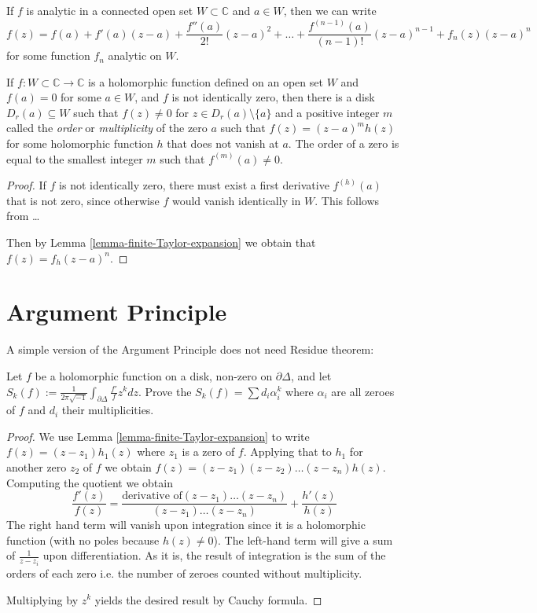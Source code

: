 \begin{lemma}
\label{lemma-finite-Taylor-expansion}
If $f$ is analytic in a connected open set $W\subset\mathbb{C}$ and $a \in W$,
then we can write
$$
f(z)=f(a)+f'(a)(z-a)+\frac{f''(a)}{2!}(z-a)^2+\ldots
+\frac{f^{(n-1)}(a)}{(n-1)!}(z-a)^{n-1}+f_n(z)(z-a)^n
$$
for some function $f_n$ analytic on $W$.
\end{lemma}

\begin{theorem}
\label{theorem-zeroes-are-isolated-and-have-finite-order}
If $f:W\subset\mathbb{C}\to \mathbb{C}$ is a holomorphic function defined on an
open set $W$ and $f(a)=0$ for some $a\in W$, and $f$ is not identically zero,
then there is a disk $D_r(a)\subseteq W$ such that $f(z)\neq 0$ for $z \in
D_r(a)\setminus\{a\}$ and a positive integer $m$ called the {\it order} or
{\it multiplicity} of the zero $a$ such that  $f(z)=(z-a)^mh(z)$ for some
holomorphic function $h$ that does not vanish at $a$. The order of a zero is
equal to the smallest integer $m$ such that $f^{(m)}(a)\neq 0$.
\end{theorem}

\begin{proof}
If $f$ is not identically zero, there must exist a first derivative $f^{
(h)}(a)$ that is not zero, since otherwise $f$ would vanish identically in $W$.
This follows from … 

Then by Lemma \ref{lemma-finite-Taylor-expansion} we obtain that
$f(z)=f_h(z-a)^n$.
\end{proof}

\section{Argument Principle}
\label{section-argument-principle}

A simple version of the Argument Principle does not need Residue theorem:

\begin{exercise}
\label{exercise-argument-principle}
Let $f$ be a holomorphic function on a disk, non-zero on $\partial \Delta$, and
let $S_k(f):=\frac{1}{2\pi\sqrt{-1}}\int_{\partial\Delta}\frac{f'}{f}z^kdz$.
Prove the $S_k(f)=\sum d_i\alpha_i^k$ where $\alpha_i$ are all zeroes of $f$ and
$d_i$ their multiplicities.
\end{exercise}

\begin{proof}
We use Lemma \ref{lemma-finite-Taylor-expansion} to write
$f(z)=(z-z_1)h_1(z)$ where $z_1$ is a zero of $f$. Applying that to $h_1$ for
another zero  $z_2$ of $f$ we obtain 
$f(z)=(z-z_1)(z-z_2)\ldots(z-z_n)h(z)$. Computing the quotient we obtain
$$
\frac{f'(z)}{f(z)}=\frac{\text{derivative of
$(z-z_1)\ldots(z-z_n)$}}{(z-z_1)\ldots(z-z_n)}+\frac{h'(z)}{h(z)}
$$
The right hand term will vanish upon integration since it is a holomorphic
function (with no poles because $h(z)\neq 0$). The left-hand term will give a
sum of $\frac{1}{z-z_i}$ upon differentiation. As it is, the result of
integration is the sum of the orders of each zero i.e. the number of zeroes
counted without multiplicity.

Multiplying by $z^k$ yields the desired result by Cauchy formula.
\end{proof}

